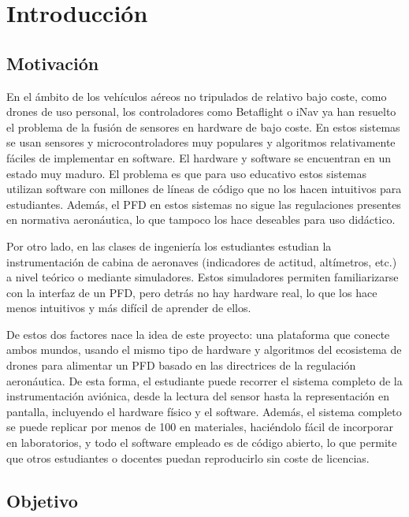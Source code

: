 
\chapter{Introducción}
\label{ch:introduccion}

\section{Motivación}
\label{sec:motivacion}

En el ámbito de los vehículos aéreos no tripulados de relativo bajo coste, como
drones de uso personal, los controladores como Betaflight o iNav ya han resuelto
el problema de la fusión de sensores en hardware de bajo coste. En estos sistemas
se usan sensores y microcontroladores muy populares y algoritmos relativamente
fáciles de implementar en software. El hardware y software se encuentran en un
estado muy maduro. El problema es que para uso educativo estos sistemas utilizan software con millones de líneas de código que no los hacen intuitivos para
estudiantes. Además, el PFD en estos sistemas no sigue las regulaciones presentes
en normativa aeronáutica, lo que tampoco los hace deseables para uso didáctico.

Por otro lado, en las clases de ingeniería los estudiantes estudian
la instrumentación de cabina de aeronaves (indicadores de actitud, altímetros,
etc.) a nivel teórico o mediante simuladores. Estos simuladores permiten
familiarizarse con la interfaz de un PFD, pero detrás no hay hardware real, lo
que los hace menos intuitivos y más difícil de aprender de ellos.

De estos dos factores nace la idea de este proyecto: una plataforma que conecte
ambos mundos, usando el mismo tipo de hardware y algoritmos del ecosistema de
drones para alimentar un PFD basado en las directrices de la regulación aeronáutica. De
esta forma, el estudiante puede recorrer el sistema completo de la
instrumentación aviónica, desde la lectura del sensor hasta la representación en
pantalla, incluyendo el hardware físico y el software. Además, el sistema
completo se puede replicar por menos de \SI{100}{\eur} en materiales, haciéndolo
fácil de incorporar en laboratorios, y todo el software empleado es de código
abierto, lo que permite que otros estudiantes o docentes puedan reproducirlo sin
coste de licencias.


\section{Objetivo}
\label{sec:objetivo}

